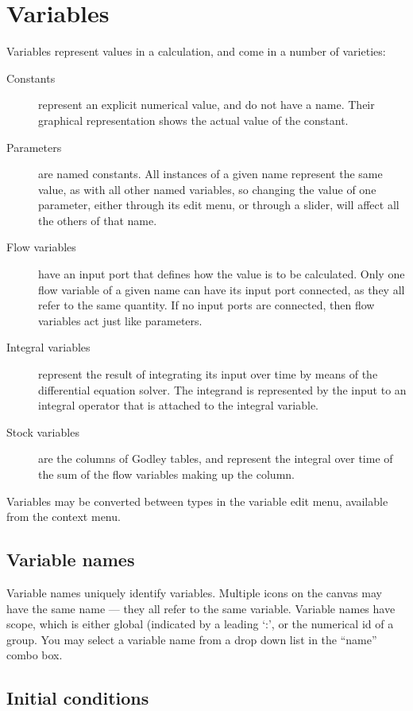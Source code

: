 \begin{description}
\end{description}

\section{Variables}

Variables represent values in a calculation, and come in a number of
varieties:
\begin{description}
\item[Constants] represent an explicit numerical value, and do not
have a name. Their graphical representation shows the actual value of
the constant.
\item[Parameters] are named constants. All instances of a given name
represent the same value, as with all other named variables, so
changing the value of one parameter, either through its edit menu, or
through a slider, will affect all the others of that name.
\item[Flow variables] have an input port that defines how the value is
to be calculated. Only one flow variable of a given name can have its
input port connected, as they all refer to the same quantity. If no
input ports are connected, then flow variables act just like
parameters.
\item[Integral variables] represent the result of integrating its
input over time  by means of the differential
equation solver. The integrand is represented by the input to an
integral operator that is attached to the integral variable.
\item[Stock variables] are the columns of Godley tables, and represent
the integral over time of the sum of the flow variables making up the
column.
\end{description}

Variables may be converted between types in the variable edit menu,
available from the context menu.

\subsection{Variable names}

Variable names uniquely identify variables. Multiple icons on the
canvas may have the same name --- they all refer to the same
variable. Variable names have scope, which is either global (indicated
by a leading `:', or the numerical id of a group. You may select a
variable name from a drop down list in the ``name'' combo box.

\subsection{Initial conditions}\label{var:init}

